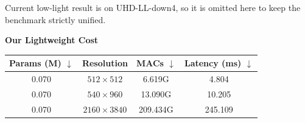 \documentclass[preview,border=6pt]{standalone}
\begin{document}
\begin{minipage}{0.98\textwidth}
\vspace{2mm}
\footnotesize Current low-light result is on UHD-LL-down4, so it is omitted here to keep the benchmark strictly unified.

\vspace{3mm}
\textbf{Our Lightweight Cost}

\vspace{2mm}
\begin{tabular}{cccc}
\toprule
Params (M) $\downarrow$ & Resolution & MACs $\downarrow$ & Latency (ms) $\downarrow$ \\
\midrule
0.070 & $512\times512$ & 6.619G & 4.804 \\
0.070 & $540\times960$ & 13.090G & 10.205 \\
0.070 & $2160\times3840$ & 209.434G & 245.109 \\
\bottomrule
\end{tabular}
\end{minipage}
\end{document}

